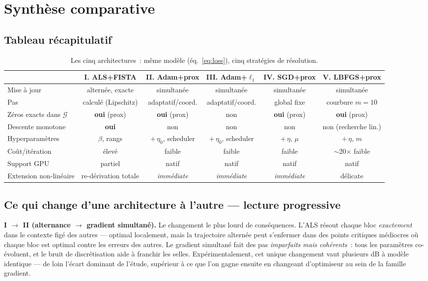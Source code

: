 \documentclass[11pt,a4paper]{article}
\newcommand{\T}[1]{\bm{\mathcal{#1}}}          %
\begin{document}
\section{Synthèse comparative}
\label{sec:discussion}

\subsection{Tableau récapitulatif}

\begin{table}[h]
\centering
\small
\begin{tabular}{@{}lccccc@{}}
\toprule
 & \textbf{I. ALS+FISTA} & \textbf{II. Adam+prox} & \textbf{III. Adam+$\ell_1$}
 & \textbf{IV. SGD+prox} & \textbf{V. LBFGS+prox} \\
\midrule
Mise à jour            & alternée, exacte & simultanée & simultanée & simultanée & simultanée \\
Pas                    & calculé (Lipschitz) & adaptatif/coord. & adaptatif/coord. & global fixe & courbure $m{=}10$ \\
Zéros exacts dans $\T{G}$ & \textbf{oui} (prox) & \textbf{oui} (prox) & non & \textbf{oui} (prox) & \textbf{oui} (prox) \\
Descente monotone      & \textbf{oui} & non & non & non & non (recherche lin.) \\
Hyperparamètres        & $\beta$, rangs & $+\,\eta_0$, scheduler & $+\,\eta_0$, scheduler & $+\,\eta$, $\mu$ & $+\,\eta$, $m$ \\
Coût/itération         & élevé & faible & faible & faible & $\sim$20$\times$ faible \\
Support GPU            & partiel & natif & natif & natif & natif \\
Extension non-linéaire & re-dérivation totale & \emph{immédiate} & \emph{immédiate} & \emph{immédiate} & délicate \\
\bottomrule
\end{tabular}
\caption{Les cinq architectures~: même modèle (éq.~\ref{eq:loss}), cinq
stratégies de résolution.}
\label{tab:comparison}
\end{table}

\subsection{Ce qui change d'une architecture à l'autre — lecture progressive}

\textbf{I $\to$ II (alternance $\to$ gradient simultané).} Le changement le
plus lourd de conséquences. L'ALS résout chaque bloc \emph{exactement} dans
le contexte figé des autres — optimal localement, mais la trajectoire
alternée peut s'enfermer dans des points critiques médiocres où chaque bloc
est optimal contre les erreurs des autres. Le gradient simultané fait des pas
\emph{imparfaits mais cohérents}~: tous les paramètres co-évoluent, et le
bruit de discrétisation aide à franchir les selles. Expérimentalement, cet
unique changement vaut plusieurs dB à modèle identique — de loin l'écart
dominant de l'étude, supérieur à ce que l'on gagne ensuite en changeant
d'optimiseur au sein de la famille gradient.
\end{document}
